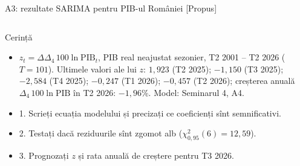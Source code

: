 \begin{frame}{A3: rezultate SARIMA pentru PIB-ul României [Propus]}
\propsub
\itemsize{\scriptsize}
\begin{columns}[T]
\begin{column}{\taskw}
\begin{block}{Cerință}
\begin{center}
\scriptsize
{}
\end{center}
\begin{itemize}
    \item $z_t = \Delta\Delta_4\,100\ln \mathrm{PIB}_t$, PIB real neajustat sezonier, T2 2001 -- T2 2026 ($T = 101$). Ultimele valori ale lui $z$: $1{,}923$ (T2 2025); $\ensuremath{-}1{,}150$ (T3 2025); $\ensuremath{-}2{,}584$ (T4 2025); $\ensuremath{-}0{,}247$ (T1 2026); $\ensuremath{-}0{,}457$ (T2 2026); creșterea anuală $\Delta_4\,100\ln \mathrm{PIB}$ în T2 2026: $\ensuremath{-}1{,}96\%$. Model: Seminarul 4, A4.
    \item 1. Scrieți ecuația modelului și precizați ce coeficienți sînt semnificativi.
    \item 2. Testați dacă reziduurile sînt zgomot alb ($\chi^2_{0,95}(6) = 12{,}59$).
    \item 3. Prognozați $z$ și rata anuală de creștere pentru T3 2026.
\end{itemize}
\end{block}
\end{column}
\begin{column}{\solw}
\end{column}
\end{columns}
\end{frame}
